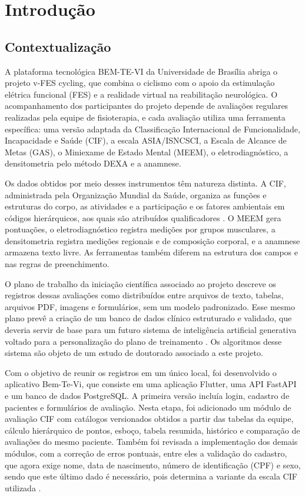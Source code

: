 \chapter{Introdução}


\section{Contextualização}

A plataforma tecnológica BEM-TE-VI da Universidade de Brasília abriga o projeto v-FES cycling, que combina o ciclismo
com o apoio da estimulação elétrica funcional (FES) e a realidade virtual na reabilitação neurológica.
O acompanhamento dos participantes do projeto depende de avaliações regulares realizadas pela equipe de fisioterapia, e
cada avaliação utiliza uma ferramenta específica: uma versão adaptada da Classificação Internacional de Funcionalidade, Incapacidade e Saúde (CIF),
a escala ASIA/ISNCSCI, a Escala de Alcance de Metas (GAS), o Miniexame de Estado Mental (MEEM), o eletrodiagnóstico, a densitometria pelo método DEXA
e a anamnese.

Os dados obtidos por meio desses instrumentos têm natureza distinta. A CIF, administrada pela Organização Mundial da Saúde, organiza
as funções e estruturas do corpo, as atividades e a participação e os fatores ambientais em códigos hierárquicos, aos quais são atribuídos qualificadores
\cite{who2001icf}. O MEEM gera pontuações, o eletrodiagnóstico registra medições por grupos musculares,
a densitometria registra medições regionais e de composição corporal, e a anamnese armazena texto livre.
As ferramentas também diferem na estrutura dos campos e nas regras de preenchimento.

O plano de trabalho da iniciação científica associado ao projeto descreve os registros dessas avaliações
como distribuídos entre arquivos de texto, tabelas, arquivos PDF, imagens e formulários, sem um modelo padronizado. Esse
mesmo plano prevê a criação de um banco de dados clínico estruturado e validado, que deveria servir de base para um futuro
sistema de inteligência artificial generativa voltado para a personalização do plano de treinamento \cite{ochoadiaz2026plano}. 
Os algoritmos desse sistema são objeto de um estudo de doutorado associado a este projeto.

Com o objetivo de reunir os registros em um único local, foi desenvolvido o aplicativo Bem-Te-Vi, que consiste
em uma aplicação Flutter, uma API FastAPI e um banco de dados PostgreSQL. A primeira versão incluía login, cadastro
de pacientes e formulários de avaliação. Nesta etapa, foi adicionado um módulo de avaliação CIF com catálogos
versionados obtidos a partir das tabelas da equipe, cálculo hierárquico de pontos, esboço, tabela resumida, histórico e
comparação de avaliações do mesmo paciente. Também foi revisada a implementação dos demais módulos, com a correção de erros pontuais,
entre eles a validação do cadastro, que agora exige nome, data de nascimento, número de identificação (CPF) e sexo, sendo que este último dado é necessário, pois
determina a variante da escala CIF utilizada \cite{higa2026bemtevi}.

